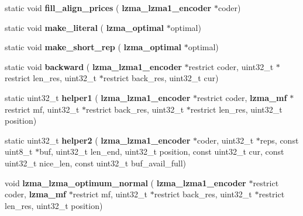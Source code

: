 \begin{DoxyCompactItemize}
\item 
\mbox{\label{lzma__encoder__optimum__normal_8c_aa333be07f488c9d8aa81389ed9f119df}} 
static void {\bfseries fill\+\_\+align\+\_\+prices} (\textbf{ lzma\+\_\+lzma1\+\_\+encoder} $\ast$coder)
\item 
\mbox{\label{lzma__encoder__optimum__normal_8c_a56dff23e3ac332b61a652c6001a2238c}} 
static void {\bfseries make\+\_\+literal} (\textbf{ lzma\+\_\+optimal} $\ast$optimal)
\item 
\mbox{\label{lzma__encoder__optimum__normal_8c_a7a5bf4462c330ea617215115064f97da}} 
static void {\bfseries make\+\_\+short\+\_\+rep} (\textbf{ lzma\+\_\+optimal} $\ast$optimal)
\item 
\mbox{\label{lzma__encoder__optimum__normal_8c_adec3a21ff24b9fa355e6ee0da2214c09}} 
static void {\bfseries backward} (\textbf{ lzma\+\_\+lzma1\+\_\+encoder} $\ast$restrict coder, uint32\+\_\+t $\ast$restrict len\+\_\+res, uint32\+\_\+t $\ast$restrict back\+\_\+res, uint32\+\_\+t cur)
\item 
\mbox{\label{lzma__encoder__optimum__normal_8c_ad86c30a13259f4597092f52ef1b86095}} 
static uint32\+\_\+t {\bfseries helper1} (\textbf{ lzma\+\_\+lzma1\+\_\+encoder} $\ast$restrict coder, \textbf{ lzma\+\_\+mf} $\ast$restrict mf, uint32\+\_\+t $\ast$restrict back\+\_\+res, uint32\+\_\+t $\ast$restrict len\+\_\+res, uint32\+\_\+t position)
\item 
\mbox{\label{lzma__encoder__optimum__normal_8c_aa6d506c22b5cb25dcc64b2d55c6f5b05}} 
static uint32\+\_\+t {\bfseries helper2} (\textbf{ lzma\+\_\+lzma1\+\_\+encoder} $\ast$coder, uint32\+\_\+t $\ast$reps, const uint8\+\_\+t $\ast$buf, uint32\+\_\+t len\+\_\+end, uint32\+\_\+t position, const uint32\+\_\+t cur, const uint32\+\_\+t nice\+\_\+len, const uint32\+\_\+t buf\+\_\+avail\+\_\+full)
\item 
\mbox{\label{lzma__encoder__optimum__normal_8c_a7f0108fbce902f375db5a3e10cd3de13}} 
void {\bfseries lzma\+\_\+lzma\+\_\+optimum\+\_\+normal} (\textbf{ lzma\+\_\+lzma1\+\_\+encoder} $\ast$restrict coder, \textbf{ lzma\+\_\+mf} $\ast$restrict mf, uint32\+\_\+t $\ast$restrict back\+\_\+res, uint32\+\_\+t $\ast$restrict len\+\_\+res, uint32\+\_\+t position)
\end{DoxyCompactItemize}
